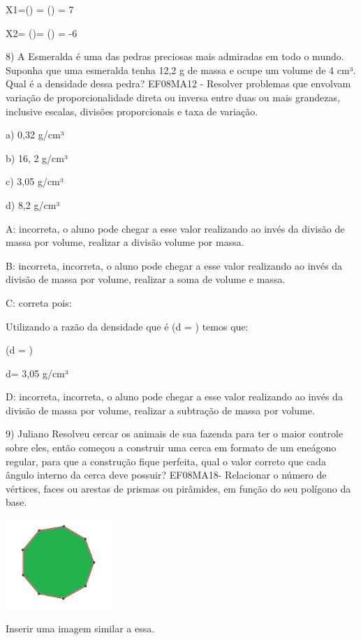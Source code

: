 X1=() = () = 7

X2= ()= () = -6

8) A Esmeralda é uma das pedras preciosas mais admiradas em todo o
mundo. Suponha que uma esmeralda tenha 12,2 g de massa e ocupe um volume
de 4 cm³. Qual é a densidade dessa pedra? EF08MA12 - Resolver problemas
que envolvam variação de proporcionalidade direta ou inversa entre duas
ou mais grandezas, inclusive escalas, divisões proporcionais e taxa de
variação.

a) 0,32 g/cm³

b) 16, 2 g/cm³

c) 3,05 g/cm³

d) 8,2 g/cm³

A: incorreta, o aluno pode chegar a esse valor realizando ao invés da
divisão de massa por volume, realizar a divisão volume por massa.

B: incorreta, incorreta, o aluno pode chegar a esse valor realizando ao
invés da divisão de massa por volume, realizar a soma de volume e massa.

C: correta pois:

Utilizando a razão da densidade que é (d = ) temos que:

(d = )

d= 3,05 g/cm³

D: incorreta, incorreta, o aluno pode chegar a esse valor realizando ao
invés da divisão de massa por volume, realizar a subtração de massa por
volume.

9) Juliano Resolveu cercar os animais de sua fazenda para ter o maior
controle sobre eles, então começou a construir uma cerca em formato de
um eneágono regular, para que a construção fique perfeita, qual o valor
correto que cada ângulo interno da cerca deve possuir? EF08MA18-
Relacionar o número de vértices, faces ou arestas de prismas ou
pirâmides, em função do seu polígono da base.

\includegraphics[width=1.575in,height=1.33385in]{./imgSAEB_8_MAT/media/image60.png}

Inserir uma imagem similar a essa.

